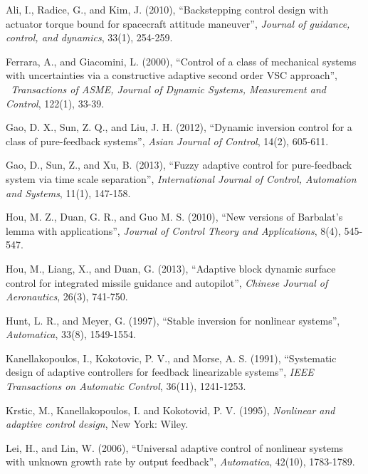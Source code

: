 \documentclass{tSYS2e}
\theoremstyle{plain}
\theoremstyle{definition}
\begin{document}
\begin{thebibliography}{99}

 Ali, I., Radice, G., and Kim, J.
(2010), ``Backstepping control design with actuator torque bound for
spacecraft attitude maneuver'', {\itshape Journal of guidance, control, and dynamics},
33(1), 254-259.

 Ferrara, A., and
Giacomini, L. (2000), ``Control of a class of mechanical systems with
uncertainties via a constructive adaptive second order VSC approach'', {\itshape
\ Transactions of ASME, Journal of Dynamic Systems, Measurement and Control},
122(1), 33-39.

 Gao, D. X., Sun, Z. Q., and Liu,
J. H. (2012), ``Dynamic inversion control for a class of pure-feedback
systems'', {\itshape Asian Journal of Control}, 14(2), 605-611.

 Gao, D., Sun, Z., and Xu, B.
(2013), ``Fuzzy adaptive control for pure-feedback system via time scale
separation'', {\itshape International Journal of Control, Automation and Systems}, 11(1),
147-158.

 Hou, M. Z., Duan, G. R., and Guo
M. S. (2010), ``New versions of Barbalat's lemma with applications'', {\itshape
Journal of Control Theory and Applications}, 8(4), 545-547.

Hou, M., Liang, X., and Duan, G. (2013),
``Adaptive block dynamic surface control for integrated missile
guidance and autopilot'', {\itshape Chinese Journal of Aeronautics}, 26(3), 741-750.

 Hunt, L. R., and Meyer, G.
(1997), ``Stable inversion for nonlinear systems'', {\itshape Automatica}, 33(8),
1549-1554.

Kanellakopoulos, I., Kokotovic, P. V., and Morse, A. S. (1991), ``Systematic
design of adaptive controllers for feedback linearizable systems'', {\itshape IEEE Transactions on Automatic
Control}, 36(11), 1241-1253.

 Krstic, M.,
Kanellakopoulos, I. and Kokotovid, P. V. (1995), {\itshape Nonlinear and
adaptive control design}, New York: Wiley.

 Lei, H., and Lin, W. (2006),
``Universal adaptive control of nonlinear systems
with unknown growth rate by output feedback'', {\itshape Automatica}, 42(10), 1783-1789.


\end{thebibliography}
\end{document}
